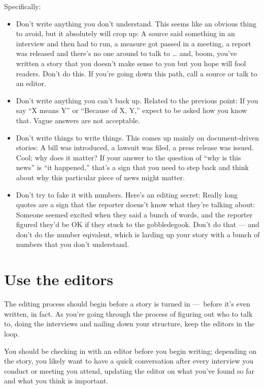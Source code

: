 \documentclass[
  12pt,
  american,
  letterpaperpaper,
  extrafontsizes,onecolumn,openright
  ]{memoir}
\providecommand{\tightlist}{%
  \setlength{\itemsep}{0pt}\setlength{\parskip}{0pt}}
\begin{document}
Specifically:

\begin{itemize}
\tightlist
\item
  Don't write anything you don't understand. This seems like an obvious thing to avoid, but it absolutely will crop up: A source said something in an interview and then had to run, a measure got passed in a meeting, a report was released and there's no one around to talk to \ldots{} and, boom, you've written a story that you doesn't make sense to you but you hope will fool readers. Don't do this. If you're going down this path, call a source or talk to an editor.
\item
  Don't write anything you can't back up. Related to the previous point: If you say \enquote{X means Y} or \enquote{Because of X, Y,} expect to be asked how you know that. Vague answers are not acceptable.
\item
  Don't write things to write things. This comes up mainly on document-driven stories: A bill was introduced, a lawsuit was filed, a press release was issued. Cool; why does it matter? If your answer to the question of \enquote{why is this news} is \enquote{it happened,} that's a sign that you need to step back and think about why this particular piece of news might matter.
\item
  Don't try to fake it with numbers. Here's an editing secret: Really long quotes are a sign that the reporter doens't know what they're talking about: Someone seemed excited when they said a bunch of words, and the reporter figured they'd be OK if they stuck to the gobbledegook. Don't do that --- and don't do the number eqivalent, which is larding up your story with a bunch of numbers that you don't understand.
\end{itemize}

\hypertarget{use-the-editors}{%
\section*{Use the editors}\label{use-the-editors}}

The editing process should begin before a story is turned in ---~before it's even written, in fact. As you're going through the process of figuring out who to talk to, doing the interviews and nailing down your structure, keep the editors in the loop.

You should be checking in with an editor before you begin writing; depending on the story, you likely want to have a quick conversation after every interview you conduct or meeting you attend, updating the editor on what you've found so far and what you think is important.
\end{document}
